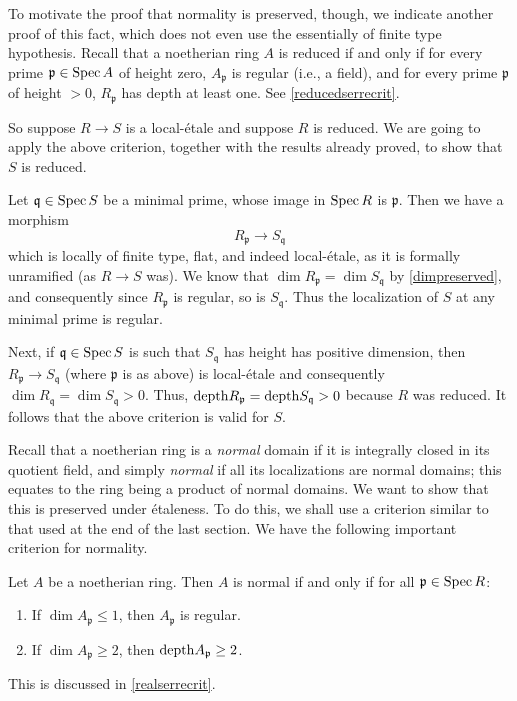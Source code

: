 To motivate the proof that normality is preserved, though, we indicate another
proof of this fact, which does not even use the essentially of finite type
hypothesis.
Recall that a noetherian ring $A$ is reduced if and only if
for every prime $\mathfrak{p} \in \operatorname{Spec} A$ of height zero,
$A_{\mathfrak{p}}$ is regular (i.e., a field), and for every 
prime $\mathfrak{p}$ of height $>0$, $R_{\mathfrak{p}}$ has depth
at least one. See \cref{reducedserrecrit}.

So suppose $R \to S$ is a local-\'etale and suppose $R$ is reduced.
We are going to apply the above criterion, together with the results already
proved, to show that $S$ is reduced.

Let $\mathfrak{q} \in \operatorname{Spec} S$ be a minimal prime, whose image in 
$\operatorname{Spec} R$ is $\mathfrak{p}$.
Then we have a morphism
\[ R_{\mathfrak{p}} \to S_{\mathfrak{q}}  \]
which is locally of finite type, flat, and indeed local-\'etale, as it is
formally unramified (as $R \to S$ was).
We know that $\dim R_{\mathfrak{p}}  = \dim S_{\mathfrak{q}}$
by \cref{dimpreserved}, and consequently 
since $R_{\mathfrak{p}}$ is regular, so is $S_{\mathfrak{q}}$.
Thus the localization of $S$ at any minimal prime is regular.

Next, if $\mathfrak{q} \in \operatorname{Spec} S$ is such that $S_{\mathfrak{q}}$ has height
has positive dimension, then $R_{\mathfrak{p}} \to S_{\mathfrak{q}}$ (where
$\mathfrak{p}$ is as above) is local-\'etale and consequently $\dim
R_{\mathfrak{q}} = \dim S_{\mathfrak{q}} > 0$. 
Thus, 
$\mathrm{depth} R_{\mathfrak{p}} = \mathrm{depth} S_{\mathfrak{q}} >0$ because $R$ was reduced.
It follows that the above criterion is valid for $S$.


Recall that a noetherian ring is a \emph{normal} domain if it is integrally closed 
in its quotient field, and simply \emph{normal} if all its localizations are
normal domains; this equates to the ring being a product of normal domains.
We want to show that this is preserved under \'etaleness.
To do this, we shall use a criterion similar to that used at the end of the
last section.
We have the following important criterion for normality.

\begin{theorem*}[Serre] Let $A$ be a noetherian ring. Then $A$ is normal if
and only if for all $\mathfrak{p} \in \operatorname{Spec} R$:
\begin{enumerate}
\item  If $\dim A_{\mathfrak{p}} \leq 1$, then $A_{\mathfrak{p}}$ is regular.
\item If $\dim A_{\mathfrak{p}} \geq 2$, then $\mathrm{depth} A_{\mathfrak{p}} \geq 2$.
\end{enumerate}
\end{theorem*} 
This is discussed in \cref{realserrecrit}.

